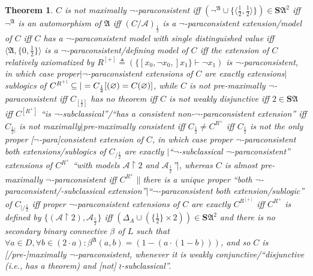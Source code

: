 \documentclass[bsl,meeting]{asl}
\newcommand{\mf}[1]{\mathfrak{#1}}
\newcommand{\mc}[1]{\mathcal{#1}}
\newcommand{\mbf}[1]{\mathbf{#1}}
\newcommand{\couple}[2]{\langle{#1},{#2}\rangle}
\newcommand{\restr}{{\upharpoonright}}
\newtheorem{theorem}{Theorem}
\def\e{{\frac{1}{2}} }
\begin{document}
\begin{theorem}
$C$ is not maximally\/ $\neg$-paraconsistent iff\/
$(\neg^{\mf{A}}\cup\{\couple{\e}{\e}\})\in\mbf{S}\mf{A}^2$ iff\/
$\neg^{\mf{A}}$ is an automorphism of\/ $\mf{A}$ iff\/
$(C/\mc{A})_\e$ is a\/ $\neg$-paraconsistent extension/model of\/
$C$ iff\/ $C$ has a\/ $\neg$-paraconsistent model with single
distinguished value iff\/ $\couple{\mf{A}}{\{0,\e\}}$
is a\/ $\neg$-paraconsistent/defining model of\/ $C$ iff
the extension of\/ $C$ relatively axiomatized by
$R^{[+]}\triangleq(\{[x_0,\neg x_0,]x_1\}\vdash\neg x_1)$
is\/ $\neg$-paraconsistent, in which case
proper\/$|\neg$-paraconsistent extensions of\/ $C$
are exactly extensions\/$|$sublogics of\/
$C^{R^{+|}}\subseteq|=C_\e[(\varnothing)\linebreak=C(\varnothing)]$,
while\/ $C$ is not pre-maximally\/ $\neg$-paraconsistent iff\/
$C_{[\e]}$ has no theorem iff\/ $C$ is not weakly disjunctive iff\/
$2\in\mbf{S}\mf{A}$ iff\/
$C^{[R^+]}$ ``is\/ $\neg$-subclassical''/``has a consistent
non-$\neg$-paraconsistent extension'' iff\/
$C_{\e|}$ is not maximally\/$|$pre-maximally consistent iff\/
$C_\e\neq C^{R^+}$ iff\/ $C_\e$ is not the only proper
[\/$\neg$-para]consistent extension of\/ $C$,
in which case proper\/ $\neg$-paraconsistent both
extensions/sublogics of\/ $C_{/\e}$ are exactly\/
$|$``\/$\neg$-subclassical\/ $\neg$-paraconsistent''
extensions of\/ $C^{R^+}$ ``with models $\mc{A}\restr2$ and
$\mc{A}_\e$''\/$|$, whereas\/ $C$ is almost pre-maximally\/
$\neg$-paraconsistent iff\/
$C^{R^+}\|$there is a unique proper ``both\/
$\neg$-paraconsistent/-subclassical
extension''\/$|$``\/$\neg$-paraconsistent both
extension/sublogic'' of\/ $C_{|/\e}$ iff proper\/
$\neg$-paraconsistent extensions of\/ $C$ are exactly\/
$C^{R^{[+]}}$ iff\/ $C^{R^+}$ is defined
by\/ $\{%
(\mc{A}\restr2),\mc{A}_\e\}$
iff\/ $(\Delta_A\cup(\{\e\}\times2))\in\mbf{S}\mf{A}^2$
and there is no secondary binary connective $\beta$ of $L$ %
such that\/ $\forall a\in D,\forall b\in(2\cdot a):
\beta^{\mf{A}}(a,b)=(1-(a\cdot(1-b)))$,
and so\/ $C$ is [/pre-]maximally\/ $\neg$-paraconsistent,
whenever it is weakly con\-jun\-c\-ti\-ve/``dis\-jun\-c\-ti\-ve (i.e., has a
theorem) and [not]\/ $\wr$-subclassical''.
\end{theorem}


\vspace*{-0.5\baselineskip}
\end{document}
